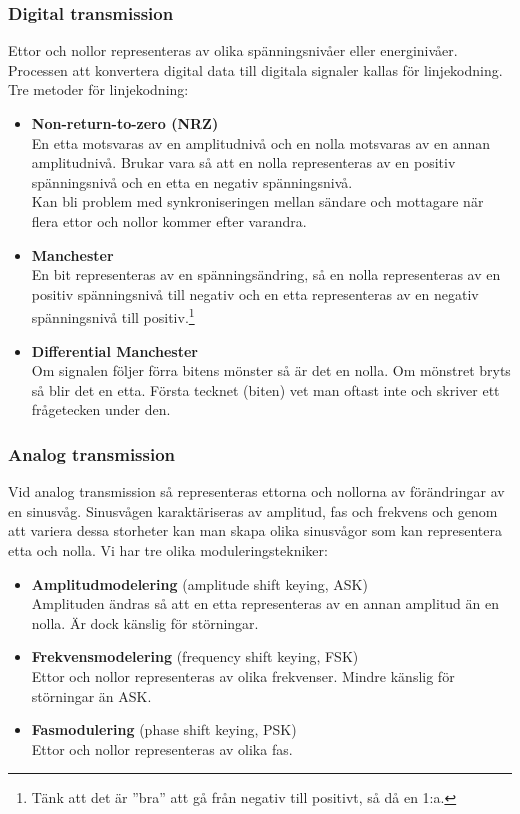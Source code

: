 \documentclass[11pt]{article}
\begin{document}
\subsubsection{Digital transmission}
Ettor och nollor representeras av olika spänningsnivåer eller energinivåer. \\
Processen att konvertera digital data till digitala signaler kallas för linjekodning. Tre metoder för linjekodning:
\begin{itemize}
\item{\textbf{Non-return-to-zero (NRZ)} \\
	En etta motsvaras av en amplitudnivå och en nolla motsvaras av en annan amplitudnivå. Brukar vara så att en nolla representeras av en positiv spänningsnivå och en etta en negativ spänningsnivå.\\
	Kan bli problem med synkroniseringen mellan sändare och mottagare när flera ettor och nollor kommer efter varandra.}
\item{\textbf{Manchester} \\
	En bit representeras av en spänningsändring, så en nolla representeras av en positiv spänningsnivå till negativ och en etta representeras av en negativ spänningsnivå till positiv.\footnote{Tänk att det är ''bra'' att gå från negativ till positivt, så då en 1:a.}}
\item{\textbf{Differential Manchester} \\
	Om signalen följer förra bitens mönster så är det en nolla. Om mönstret bryts så blir det en etta. Första tecknet (biten) vet man oftast inte och skriver ett frågetecken under den.}
\end{itemize}
\subsubsection{Analog transmission}
Vid analog transmission så representeras ettorna och nollorna av förändringar av en sinusvåg. Sinusvågen karaktäriseras av amplitud, fas och frekvens och genom att variera dessa storheter kan man skapa olika sinusvågor som kan representera etta och nolla. Vi har tre olika moduleringstekniker:
\begin{itemize}
\item{\textbf{Amplitudmodelering} (amplitude shift keying, ASK) \\
	Amplituden ändras så att en etta representeras av en annan amplitud än en nolla. Är dock känslig för störningar.}
\item{\textbf{Frekvensmodelering} (frequency shift keying, FSK) \\
	Ettor och nollor representeras av olika frekvenser. Mindre känslig för störningar än ASK. }
\item{\textbf{Fasmodulering} (phase shift keying, PSK) \\
	Ettor och nollor representeras av olika fas.}
\end{itemize}
\end{document}
